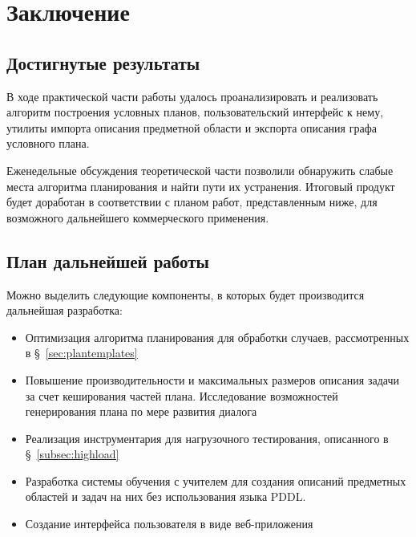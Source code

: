 \chapter*{Заключение}

\section*{Достигнутые результаты}

В ходе практической части работы удалось проанализировать и реализовать алгоритм построения условных планов, пользовательский интерфейс к нему, утилиты импорта описания предметной области и экспорта описания графа условного плана.

Еженедельные обсуждения теоретической части позволили обнаружить слабые места алгоритма планирования и найти пути их устранения. Итоговый продукт будет доработан в соответствии с планом работ, представленным ниже, для возможного дальнейшего коммерческого применения.

\section*{План дальнейшей работы}

Можно выделить следующие компоненты, в которых будет производится дальнейшая разработка:

\begin{itemize}
 \item Оптимизация алгоритма планирования для обработки случаев, рассмотренных в \S~\ref{sec:plantemplates}
 \item Повышение производительности и максимальных размеров описания задачи за счет кеширования частей плана. Исследование возможностей генерирования плана по мере развития диалога
 \item Реализация инструментария для нагрузочного тестирования, описанного в \S~\ref{subsec:highload}
 \item Разработка системы обучения с учителем для создания описаний предметных областей и задач на них без использования языка PDDL.
 \item Создание интерфейса пользователя в виде веб-приложения
\end{itemize}
